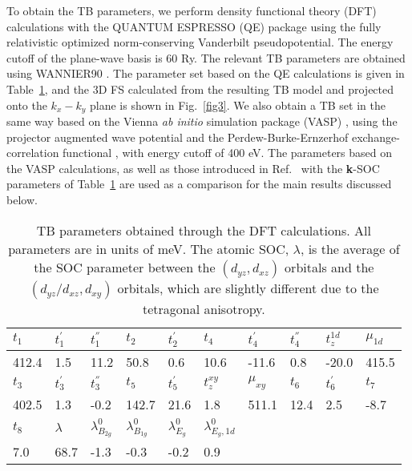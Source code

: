 \documentclass[%
reprint,
superscriptaddress,
 amsmath,amssymb,
 aps,
prb,
nobalancelastpage,
]{revtex4-2}
\begin{document}
To obtain the TB parameters, we perform density functional theory (DFT) calculations with the QUANTUM ESPRESSO (QE) package \cite{Giannozzi_2009, Giannozzi_2017} using the fully relativistic optimized norm-conserving Vanderbilt \cite{HamannPRB2017} pseudopotential. The energy cutoff of the plane-wave basis is 60 Ry. The relevant TB parameters are obtained using WANNIER90 \cite{MOSTOFI2014}. The parameter set based on the QE calculations is given in Table~\ref{TBparams_QE}, and the 3D FS calculated from the resulting TB model and projected onto the $k_{x}-k_{y}$ plane is shown in Fig.~\ref{fig3}. We also obtain a TB set in the same way based on the Vienna \textit{ab initio} simulation package (VASP) \cite{KressePRB1993}, using the projector augmented wave potential \cite{BlochlPRB1994} and the Perdew-Burke-Ernzerhof exchange-correlation functional \cite{PerdewPRL1996}, with energy cutoff of 400 eV. The parameters based on the VASP calculations, as well as those introduced in Ref.~\cite{Roising2019prr} with the \textbf{k}-SOC parameters of Table~\ref{TBparams_QE} are used as a comparison for the main results discussed below. 





\begin{table}[h!]
\centering
\caption{TB parameters obtained through the DFT calculations. All parameters are in units of meV. The atomic SOC, $\lambda$, is the average of the SOC parameter between the $(d_{yz},d_{xz})$ orbitals and the $(d_{yz}/d_{xz},d_{xy})$ orbitals, which are slightly different due to the tetragonal anisotropy.}
 \begin{tabular}{| m{0.75cm}  m{0.75cm} m{0.75cm}  m{0.75cm}  m{0.75cm}  m{0.75cm}  m{0.75cm} m{0.75cm} m{0.75cm} m{0.75cm} |}
 \hline\hline
 $t_{1}$ & $t_{1}^{'}$ & $t_{1}^{''}$ & $t_{2}$ & $t_{2}^{'}$ & $t_{4}$ & $t_{4}^{'}$ & $t_{4}^{''}$ & $t_{z}^{1d}$ & $\mu_{1d}$ \\  
 \hline
 412.4 & 1.5 & 11.2 & 50.8 & 0.6 & 10.6 & -11.6 & 0.8 & -20.0 & 415.5  \\ 
 \hline
 $t_{3}$ & $t_{3}^{'}$ & $t_{3}^{''}$ & $t_{5}$ & $t_{5}^{'}$ & $t_{z}^{xy}$ &  $\mu_{xy}$ & $t_{6}$ & $t_{6}^{'}$ & $t_{7}$\\
 \hline
  402.5 & 1.3 & -0.2 & 142.7 & 21.6 & 1.8 & 511.1  & 12.4 & 2.5 & -8.7 \\ 
  \hline
  $t_{8}$ & $\lambda$ & $\lambda_{B_{2g}}^{0}$ & $\lambda_{B_{1g}}^{0}$ & $\lambda_{E_{g}}^{0}$ & $\lambda_{E_{g},1d}^{0}$ &  & & &\\
  \hline
  7.0 & 68.7 & -1.3 & -0.3 & -0.2 & 0.9 & & & & \\ 
 \hline\hline
\end{tabular}
\label{TBparams_QE}
\end{table}
\end{document}
